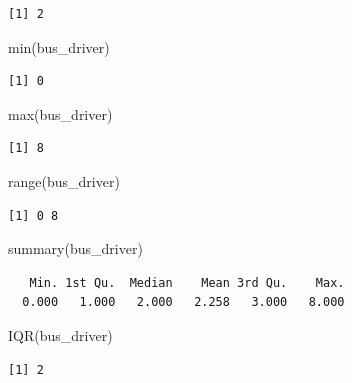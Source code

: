 \documentclass[
  letterpaper,
  DIV=11,
  numbers=noendperiod]{scrreprt}
\newenvironment{Shaded}{\begin{snugshade}}{\end{snugshade}}
\newcommand{\FunctionTok}[1]{\textcolor[rgb]{0.28,0.35,0.67}{#1}}
\newcommand{\NormalTok}[1]{\textcolor[rgb]{0.00,0.23,0.31}{#1}}
\begin{document}
\begin{tcolorbox}
\begin{verbatim}
[1] 2
\end{verbatim}

\begin{Shaded}
\begin{Highlighting}[]
\FunctionTok{min}\NormalTok{(bus\_driver)}
\end{Highlighting}
\end{Shaded}

\begin{verbatim}
[1] 0
\end{verbatim}

\begin{Shaded}
\begin{Highlighting}[]
\FunctionTok{max}\NormalTok{(bus\_driver)}
\end{Highlighting}
\end{Shaded}

\begin{verbatim}
[1] 8
\end{verbatim}

\begin{Shaded}
\begin{Highlighting}[]
\FunctionTok{range}\NormalTok{(bus\_driver)}
\end{Highlighting}
\end{Shaded}

\begin{verbatim}
[1] 0 8
\end{verbatim}

\begin{Shaded}
\begin{Highlighting}[]
\FunctionTok{summary}\NormalTok{(bus\_driver)}
\end{Highlighting}
\end{Shaded}

\begin{verbatim}
   Min. 1st Qu.  Median    Mean 3rd Qu.    Max. 
  0.000   1.000   2.000   2.258   3.000   8.000 
\end{verbatim}

\begin{Shaded}
\begin{Highlighting}[]
\FunctionTok{IQR}\NormalTok{(bus\_driver)}
\end{Highlighting}
\end{Shaded}

\begin{verbatim}
[1] 2
\end{verbatim}


\end{tcolorbox}
\end{document}
